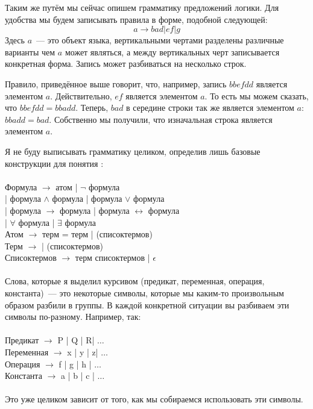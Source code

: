 Таким же путём мы сейчас опишем грамматику предложений логики. Для удобства мы будем записывать правила в форме, подобной следующей:
$$a \to bad | ef | g$$
Здесь $a$~--- это объект языка, вертикальными чертами разделены различные варианты чем $a$ может являться, а между вертикальных черт записывается конкретная форма. Запись может разбиваться на несколько строк.

\begin{example}
Правило, приведённое выше говорит, что, например, запись  $bbefdd$ является элементом $a$. Действительно, $ef$ является элементом $a$. То есть мы можем сказать, что $bbefdd = bbadd$. Теперь, $bad$ в середине строки так же является элементом $a$: $bbadd = bad$. Собственно мы получили, что изначальная строка является элементом $a$.
\end{example}

Я не буду выписывать грамматику целиком, определив лишь базовые конструкции для понятия :\\
\\
Формула $\to$ атом | $\neg$ формула\\
\hspace*{2cm}| формула $\land$ формула | формула $\lor$ формула\\
\hspace*{2cm}| формула $\to$ формула | формула $\leftrightarrow$ формула\\
\hspace*{2cm}| $\forall$  формула | $\exists$  формула\\
Атом $\to$ терм = терм |  (списоктермов)\\
Терм $\to$  |  (списоктермов)\\
Списоктермов $\to$ терм списоктермов | $\epsilon$\\
\\
Слова, которые я выделил курсивом (предикат, переменная, операция, константа)~--- это некоторые символы, которые мы каким-то произвольным образом разбили в группы. В каждой конкретной ситуации вы разбиваем эти символы по-разному. Например, так:\\
\\
Предикат $\to$ P | Q | R| $\ldots$\\
Переменная $\to$ x | y | z| $\ldots$\\
Операция $\to$ f | g | h | $\ldots$\\
Константа $\to$ a | b | c | $\ldots$\\
\\
Это уже целиком зависит от того, как мы собираемся использовать эти символы.

